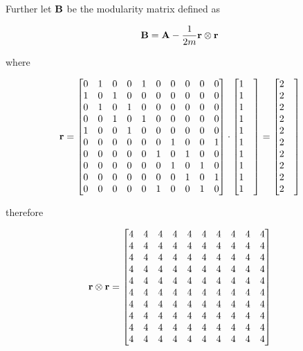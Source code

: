 \documentclass[a4paper,12pt]{article}
\begin{document}
	Further let $\bf B$ be the modularity matrix defined as 
	
	\[ {\bf B} = {\bf A} - \frac{1}{2m}{\bf r}\otimes {\bf r} \]
	
	where 
	
	\[ {\bf r} = \begin{bmatrix}
		0& 1& 0& 0& 1& 0& 0& 0& 0& 0\\
		1& 0& 1& 0& 0& 0& 0& 0& 0& 0\\
		0& 1& 0& 1& 0& 0& 0& 0& 0& 0\\
		0& 0& 1& 0& 1& 0& 0& 0& 0& 0\\
		1& 0& 0& 1& 0& 0& 0& 0& 0& 0\\
		0& 0& 0& 0& 0& 0& 1& 0& 0& 1\\
		0& 0& 0& 0& 0& 1& 0& 1& 0& 0\\
		0& 0& 0& 0& 0& 0& 1& 0& 1& 0\\
		0& 0& 0& 0& 0& 0& 0& 1& 0& 1\\
		0& 0& 0& 0& 0& 1& 0& 0& 1& 0
	\end{bmatrix} \cdot \begin{bmatrix}
		1 & \\ 1 & \\ 1 & \\ 1 & \\ 1 & \\ 1 & \\ 1 & \\ 1 & \\ 1 & \\ 1 & \\
	\end{bmatrix} = \begin{bmatrix}
		2 & \\ 2 & \\ 2 & \\ 2 & \\ 2 & \\ 2 & \\ 2 & \\ 2 & \\ 2 & \\ 2 & \\
	\end{bmatrix} \]
	
	therefore
	
	\[ {\bf r}\otimes {\bf r} = \begin{bmatrix}
		4& 4& 4& 4& 4& 4& 4& 4& 4& 4\\
		4& 4& 4& 4& 4& 4& 4& 4& 4& 4\\
		4& 4& 4& 4& 4& 4& 4& 4& 4& 4\\
		4& 4& 4& 4& 4& 4& 4& 4& 4& 4\\
		4& 4& 4& 4& 4& 4& 4& 4& 4& 4\\
		4& 4& 4& 4& 4& 4& 4& 4& 4& 4\\
		4& 4& 4& 4& 4& 4& 4& 4& 4& 4\\
		4& 4& 4& 4& 4& 4& 4& 4& 4& 4\\
		4& 4& 4& 4& 4& 4& 4& 4& 4& 4\\
		4& 4& 4& 4& 4& 4& 4& 4& 4& 4
	\end{bmatrix}\]
	
\end{document}
